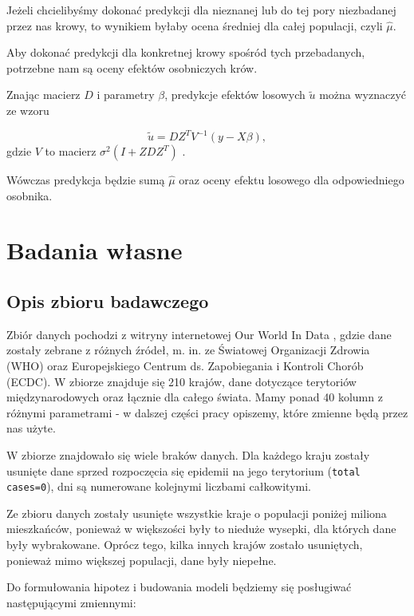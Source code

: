 \documentclass[12pt]{mwbk}
\theoremstyle{plain}
\theoremstyle{definition}
\theoremstyle{remark}
\begin{document}
 Jeżeli chcielibyśmy dokonać predykcji dla nieznanej lub do tej pory niezbadanej przez nas krowy, to wynikiem byłaby ocena średniej dla całej populacji, czyli $\hat{\mu}$.
 
 Aby dokonać predykcji dla konkretnej krowy spośród tych przebadanych, potrzebne nam są oceny efektów osobniczych krów.
 
 Znając macierz $D$ i parametry $\beta$, predykcje efektów losowych $\widetilde{u}$ można wyznaczyć ze wzoru
 
 $$\widetilde{u}=DZ^TV^{-1}(y-X\beta),$$
 gdzie $V$ to macierz $\sigma^2(I+ZDZ^T)$ \cite{biecek}.
 
 Wówczas predykcja będzie sumą $\hat{\mu}$ oraz oceny efektu losowego dla odpowiedniego osobnika.
 
\chapter{Badania własne}
\section{Opis zbioru badawczego}

Zbiór danych pochodzi z witryny internetowej Our World In Data \cite{owid}, gdzie dane zostały zebrane z różnych źródeł, m. in. ze Światowej Organizacji Zdrowia (WHO) oraz Europejskiego Centrum ds. Zapobiegania i Kontroli Chorób (ECDC). W zbiorze znajduje się 210 krajów, dane dotyczące terytoriów międzynarodowych oraz łącznie dla całego świata. Mamy ponad 40 kolumn z różnymi parametrami - w dalszej części pracy opiszemy, które zmienne będą przez nas użyte.

W zbiorze znajdowało się wiele braków danych. Dla każdego kraju zostały usunięte dane sprzed rozpoczęcia się epidemii na jego terytorium (\texttt{total cases=0}), dni są numerowane kolejnymi liczbami całkowitymi.

Ze zbioru danych zostały usunięte wszystkie kraje o populacji poniżej miliona mieszkańców, ponieważ w większości były to nieduże wysepki, dla których dane były wybrakowane. Oprócz tego, kilka innych krajów zostało usuniętych, ponieważ mimo większej populacji, dane były niepełne.

Do formułowania hipotez i budowania modeli będziemy się posługiwać następującymi zmiennymi:
\end{document}
